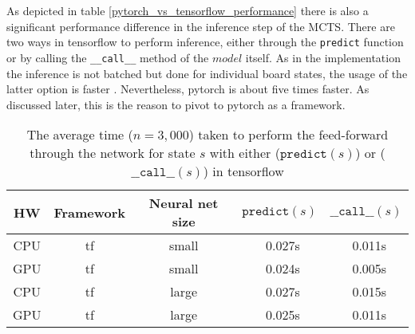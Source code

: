 As depicted in table \ref{pytorch_vs_tensorflow_performance} there is also a significant performance difference in the inference step of the MCTS. There are two ways in tensorflow to perform inference, either through the \texttt{predict} function or by calling the \texttt{\_\_call\_\_} method of the $model$ itself. As in the implementation the inference is not batched but done for individual board states, the usage of the latter option is faster \cite{noauthor_tfkerasmodel_nodate}. Nevertheless, pytorch is about five times faster. As discussed later, this is the reason to pivot to pytorch as a framework.

\begin{table*}
    \begin{center}
        \begin{tabular}{ c|c|c|c|c }
            HW  & Framework & Neural net size & $\texttt{predict}(s)$ & $\texttt{\_\_call\_\_}(s)$ \\
            \hline
            \hline
            CPU & tf        & small           & ~0.027s               & ~0.011s                    \\
            GPU & tf        & small           & ~0.024s               & ~0.005s                    \\
            CPU & tf        & large           & ~0.027s               & ~0.015s                    \\
            GPU & tf        & large           & ~0.025s               & ~0.011s                    \\
        \end{tabular}
    \end{center}
    \caption{The average time ($n = 3,000$) taken to perform the feed-forward through the network for state $s$ with either ($\texttt{predict}(s)$) or ($\texttt{\_\_call\_\_}(s)$) in tensorflow}\label{tensorflow_predict_vs_call}
\end{table*}

